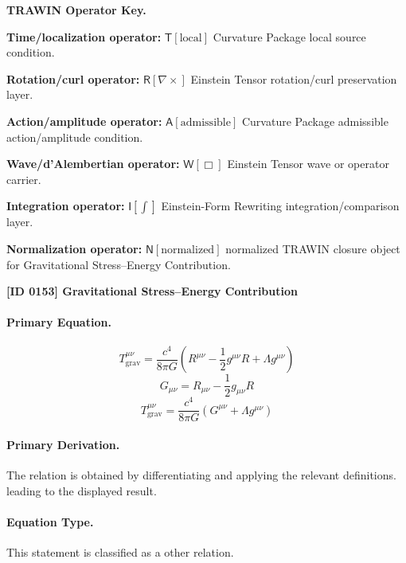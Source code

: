 \par\vspace{0.45\baselineskip}
\noindent\begin{minipage}[t]{\linewidth}
\begingroup
\small
\raggedright
\textbf{TRAWIN Operator Key.}\par
\noindent\textbf{Time/localization operator:} $\mathsf{T}\!\left[\mathrm{local}\right]$ Curvature Package local source condition.\par
\noindent\textbf{Rotation/curl operator:} $\mathsf{R}\!\left[\nabla\times\right]$ Einstein Tensor rotation/curl preservation layer.\par
\noindent\textbf{Action/amplitude operator:} $\mathsf{A}\!\left[\mathrm{admissible}\right]$ Curvature Package admissible action/amplitude condition.\par
\noindent\textbf{Wave/d'Alembertian operator:} $\mathsf{W}\!\left[\Box\right]$ Einstein Tensor wave or operator carrier.\par
\noindent\textbf{Integration operator:} $\mathsf{I}\!\left[\int\right]$ Einstein-Form Rewriting integration/comparison layer.\par
\noindent\textbf{Normalization operator:} $\mathsf{N}\!\left[\mathrm{normalized}\right]$ normalized TRAWIN closure object for Gravitational Stress--Energy Contribution.\par
\endgroup
\end{minipage}

\clearpage
\noindent\textbf{[ID 0153] Gravitational Stress--Energy Contribution}\par
\vspace{0.35em}
\paragraph{Primary Equation.}
\[
T_{\mathrm{grav}}^{\mu\nu}
=
\frac{c^4}{8\pi G}
\left(
R^{\mu\nu}-\frac{1}{2}g^{\mu\nu}R+\Lambda g^{\mu\nu}
\right)
\]
\[
G_{\mu\nu}=R_{\mu\nu}-\frac{1}{2}g_{\mu\nu}R
\]
\[
T_{\mathrm{grav}}^{\mu\nu}
=
\frac{c^4}{8\pi G}
\left(
G^{\mu\nu}+\Lambda g^{\mu\nu}
\right)
\]

\paragraph{Primary Derivation.}
The relation is obtained by differentiating and applying the relevant definitions. leading to the displayed result.
\paragraph{Equation Type.}
This statement is classified as a other relation.

